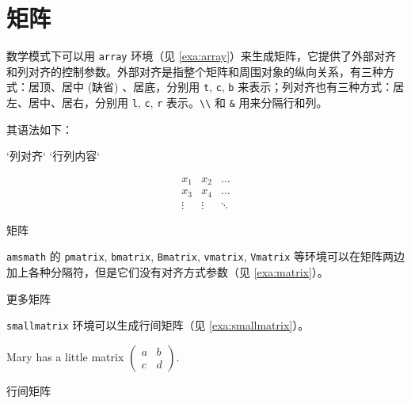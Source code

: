 \section{矩阵}

数学模式下可以用 \texttt{array} 环境（见 \autoref{exa:array}）来生成矩阵，它提供了外部对齐和列对齐的控制参数。外部对齐是指整个矩阵和周围对象的纵向关系，有三种方式：居顶、居中 (缺省) 、居底，分别用 \texttt{t}, \texttt{c}, \texttt{b} 来表示；列对齐也有三种方式：居左、居中、居右，分别用 \texttt{l}, \texttt{c}, \texttt{r} 表示。\verb|\\| 和 \verb|&| 用来分隔行和列。

其语法如下：

\begin{Code}[]
\begin{array}[`外部对齐`]{`列对齐`}
  `行列内容`
\end{array}
\end{Code}

\begin{example}[htbp]
\begin{RLDemo}[numbers=left]
\[ \begin{array}{ccc}
x_1 & x_2 & \dots \\
x_3 & x_4 & \dots \\
\vdots & \vdots & \ddots
\end{array} \]
\end{RLDemo}
\caption{矩阵}
\label{exa:array}
\end{example}

\texttt{amsmath} 的 \texttt{pmatrix}, \texttt{bmatrix}, \texttt{Bmatrix}, \texttt{vmatrix}, \texttt{Vmatrix} 等环境可以在矩阵两边加上各种分隔符，但是它们没有对齐方式参数（见 \autoref{exa:matrix}）。

\begin{example}[htbp]
\caption{更多矩阵}
\label{exa:matrix}
\end{example}

\verb|smallmatrix| 环境可以生成行间矩阵（见 \autoref{exa:smallmatrix}）。

\begin{example}[!h]
\begin{BTDemo}[]
Mary has a little matrix $ ( \begin{smallmatrix} 
a&b\\c&d \end{smallmatrix} ) $.
\end{BTDemo}
\caption{行间矩阵}
\label{exa:smallmatrix}
\end{example}

